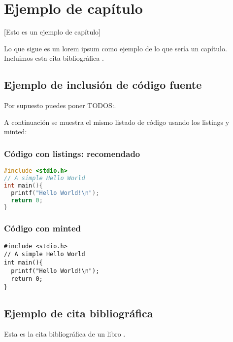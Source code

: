 \chapter{Ejemplo de capítulo}

[Esto es un ejemplo de capítulo]

Lo que sigue es un lorem ipsum como ejemplo de lo que sería un capítulo. Incluimos esta cita bibliográfica \cite{recomendaciones}.

\lipsum

\section{Ejemplo de inclusión de código fuente}

Por supuesto puedes poner TODOS:.


A continuación se muestra el mismo listado de código usando los listings y minted:

\subsection{Código con listings: recomendado}

\begin{lstlisting}[language=c]
#include <stdio.h>
// A simple Hello World
int main(){
  printf("Hello World!\n");
  return 0;
}
\end{lstlisting}

\subsection{Código con minted}

\begin{verbatim}
#include <stdio.h>
// A simple Hello World
int main(){
  printf("Hello World!\n");
  return 0;
}
\end{verbatim}

\section{Ejemplo de cita bibliográfica}

Esta es la cita bibliográfica de un libro \cite{ec}.

